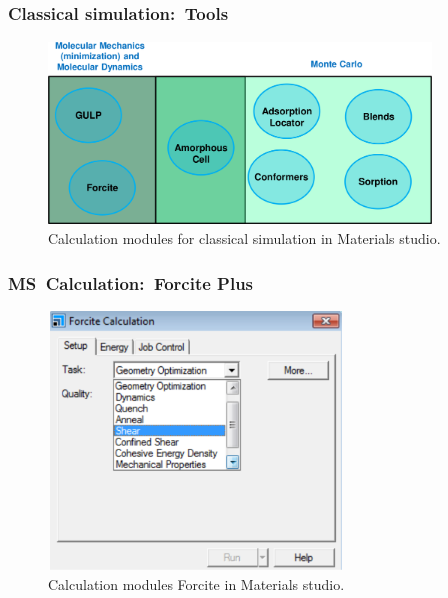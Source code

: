 \frame
{
	\frametitle{\textrm{Classical simulation:~Tools}}
\begin{figure}[h!]
\centering
\vspace*{-0.10in}
\includegraphics[height=1.91in,width=4.00in,viewport=0 0 1494 711,clip]{Figures/MS-Classical_simulation-tools.png}
\caption{\tiny \textrm{Calculation modules for classical simulation in Materials studio.}}%
\label{MS-Classical_simulation-}
\end{figure}
}

\frame
{
	\frametitle{\textrm{MS~Calculation:~Forcite Plus}}
\begin{figure}[h!]
\centering
\vspace*{-0.18in}
\includegraphics[height=2.70in,width=3.08in,viewport=0 0 845 741,clip]{Figures/MS-Caluculator_Forcite-parameter.png}
\caption{\tiny \textrm{Calculation modules Forcite in Materials studio.}}%
\label{MS-Forcite_Plus}
\end{figure}
}

